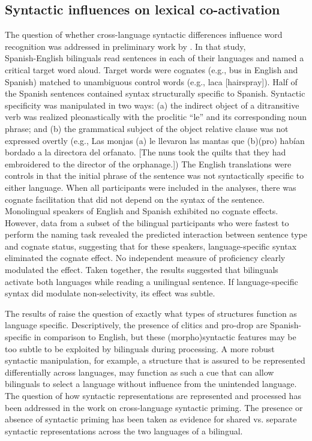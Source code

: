\subsection{Syntactic influences on lexical co-activation}
\label{syntacticinfluencesonlexicalco-activation}

The question of whether cross-language syntactic differences influence word recognition was addressed in preliminary work by  \citet{Gullifer2011}. In that study,\\ Spanish-English bilinguals read sentences in each of their languages and named a critical target word aloud. Target words were cognates (e.g., bus in English and Spanish) matched to unambiguous control words (e.g., laca [hairspray]). Half of the Spanish sentences contained syntax structurally specific to Spanish. Syntactic specificity was manipulated in two ways: (a) the indirect object of a ditransitive verb was realized pleonastically with the proclitic ``le'' and its corresponding noun phrase; and (b) the grammatical subject of the object relative clause was not expressed overtly (e.g., Las monjas (a) le llevaron las mantas que (b)(pro) hab\'{i}an bordado a la directora del orfanato. [The nuns took the quilts that they had embroidered to the director of the orphanage.]) The English translations were controls in that the initial phrase of the sentence was not syntactically specific to either language. When all participants were included in the analyses, there was cognate facilitation that did not depend on the syntax of the sentence. Monolingual speakers of English and Spanish exhibited no cognate effects. However, data from a subset of the bilingual participants who were fastest to perform the naming task revealed the predicted interaction between sentence type and cognate status, suggesting that for these speakers, language-specific syntax eliminated the cognate effect. No independent measure of proficiency clearly modulated the effect. Taken together, the results suggested that bilinguals activate both languages while reading a unilingual sentence. If language-specific syntax did modulate non-selectivity, its effect was subtle. 

The results of  \citet{Gullifer2011} raise the question of exactly what types of structures function as language specific. Descriptively, the presence of clitics and pro-drop are Spanish-specific in comparison to English, but these (morpho)syntactic features may be too subtle to be exploited by bilinguals during processing. A more robust syntactic manipulation, for example, a structure that is assured to be represented differentially across languages, may function as such a cue that can allow bilinguals to select a language without influence from the unintended language. The question of how syntactic representations are represented and processed has been addressed in the work on cross-language syntactic priming. The presence or absence of syntactic priming has been taken as evidence for shared vs. separate syntactic representations across the two languages of a bilingual. 

